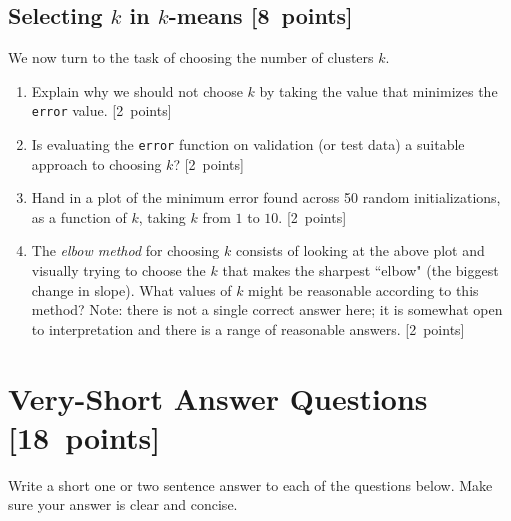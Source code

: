 \documentclass{article}
\newcommand{\blu}[1]{{\textcolor{blu}{#1}}}
\let\ask\blu
\newcommand\pts[1]{\textcolor{pointscolour}{[#1~points]}}
\begin{document}
    \clearpage
    \subsection{Selecting $k$ in $k$-means \pts{8}}

    We now turn to the task of choosing the number of clusters $k$.

    \begin{enumerate}
        \item \ask{Explain why we should not choose $k$ by taking the value that minimizes the \texttt{error} value.} \pts{2}
        \item \ask{Is evaluating the \texttt{error} function on validation (or test data) a suitable approach to choosing $k$?} \pts{2}

        \item \ask{Hand in a plot of the minimum error found across 50 random initializations, as a function of $k$, taking $k$ from $1$ to $10$.} \pts{2}
        \item The \emph{elbow method} for choosing $k$ consists of looking at the above plot and visually trying to choose the $k$ that makes the sharpest ``elbow" (the biggest change in slope). \ask{What values of $k$ might be reasonable according to this method?} Note: there is not a single correct answer here; it is somewhat open to interpretation and there is a range of reasonable answers. \pts{2}
    \end{enumerate}

    \clearpage
    \section{Very-Short Answer Questions \pts{18}}

    \ask{Write a short one or two sentence answer to each of the questions below}. Make sure your answer is clear and concise.
\end{document}
